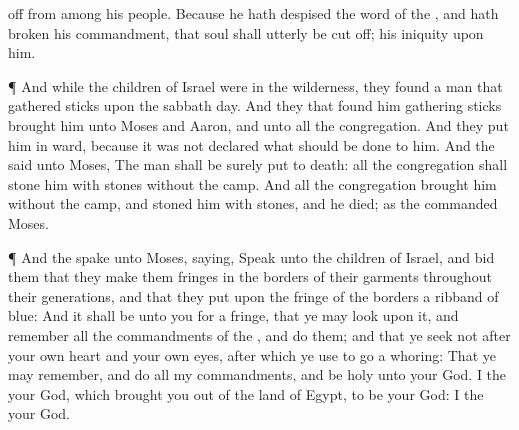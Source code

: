 {off from
among his
people.
Because he hath
despised the
word of the
{}, and hath
broken his
commandment, that
soul shall
utterly be cut
off; his
iniquity
{} upon him.
\par }{\PP {}¶ And while the
children of
Israel were in the
wilderness, they
found a
man that
gathered
sticks upon the
sabbath
day.
And they that
found him
gathering
sticks
brought him unto
Moses and
Aaron, and unto all the
congregation.
And they
put him in
ward, because it was not
declared what should be
done to him.
And the
{}
said unto
Moses, The
man shall be
surely put to
death: all the
congregation shall
stone him with
stones
without the
camp.
And all the
congregation
brought him
without the
camp, and
stoned him with
stones, and he
died; as the
{}
commanded
Moses.
\par }{\PP {}¶ And the
{}
spake unto
Moses,
saying,
Speak unto the
children of
Israel, and
bid them that they
make them
fringes in the
borders of their
garments throughout their
generations, and that they
put upon the
fringe of the
borders a
ribband of
blue:
And it shall be unto you for a
fringe, that ye may
look upon it, and
remember all the
commandments of the
{}, and
do them; and that ye
seek not
after your own
heart and your own
eyes,
after which ye use to go a
whoring:
That ye may
remember, and
do all my
commandments, and
be
holy unto your
God.
I
{} the
{} your
God, which brought you
out of the
land of
Egypt, to be your
God: I
{} the
{} your
God.

}
